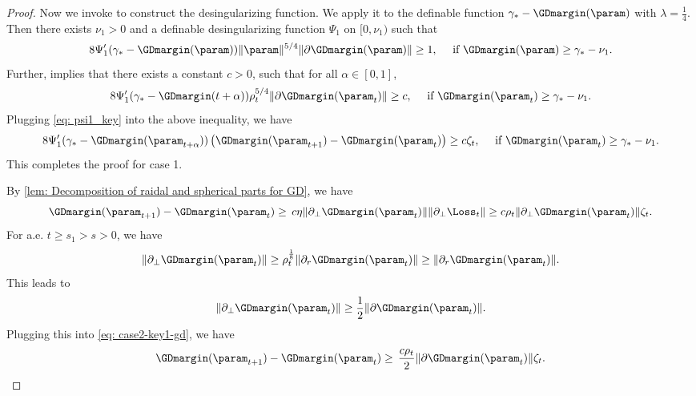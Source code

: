 \begin{proof}
    Now we invoke  to construct the desingularizing function.  We apply it to the definable function $\gamma_* - \GDmargin(\param)$ with $\lambda=\frac{1}{4}$. Then there exists $\nu_1 >0$ and a definable desingularizing function $\Psi_1$ on $[0, \nu_1)$ such that 
    \[
        8 \Psi_1^\prime(\gamma_* - \GDmargin(\param)) \| \param \|^{5/4} \|\partial \GDmargin(\param)\| \ge 1, \quad \text{ if }  \GDmargin(\param) \ge \gamma_* - \nu_1.
    \] 
    Further,  implies that there exists a constant $c>0$, such that for all $\alpha \in [0, 1]$,
    \begin{equation}
        8 \Psi_1^\prime(\gamma_* - \GDmargin(t+\alpha)) \rho_t^{5/4} \|\partial \GDmargin(\param_t) \| \ge c, \quad \text{ if }  \GDmargin(\param_t) \ge \gamma_* - \nu_1.
    \end{equation}
    Plugging \eqref{eq: psi1_key} into the above inequality, we have 
    \[
        8 \Psi_1^\prime(\gamma_* - \GDmargin (\param_{t+\alpha})) \left( \GDmargin (\param_{t+1}) - \GDmargin (\param_t) \right) \ge c \zeta_t, \quad \text{ if }  \GDmargin (\param_t) \ge \gamma_* - \nu_1.
    \]
    This completes the proof for case 1. 
    
     By \cref{lem: Decomposition of raidal and spherical parts for GD}, we have 
    \begin{equation}
    \label{eq: case2-key1-gd}
           \GDmargin (\param_{t+1}) - \GDmargin (\param_t) \ge \, c \eta \| \partial_\perp \GDmargin(\param_t) \| \| \partial_\perp \Loss_t\| \ge c \rho_t \|  \partial_\perp \GDmargin(\param_t) \| \zeta_t. 
    \end{equation}
    For a.e. $t\ge s_1 >s >0$, we have 
    \[
        \| \partial_\perp \GDmargin (\param_t) \| \ge  \rho_t^{\frac{1}{8}} \| \partial_r \GDmargin (\param_t) \| \ge \| \partial_r \GDmargin (\param_t) \|.
    \]
    This leads to 
    \[
        \| \partial_\perp \GDmargin (\param_t) \| \ge \frac{1}{2} \| \partial \GDmargin (\param_t)\|. 
    \]
    Plugging this into \eqref{eq: case2-key1-gd}, we have 
    \begin{equation}
    \label{eq: case2-key2-gd}
    \GDmargin (\param_{t+1}) - \GDmargin (\param_t) \ge \, \frac{c \rho_t}{2} \| \partial  \GDmargin (\param_t)\| \zeta_t.
    \end{equation}
    

\end{proof}
